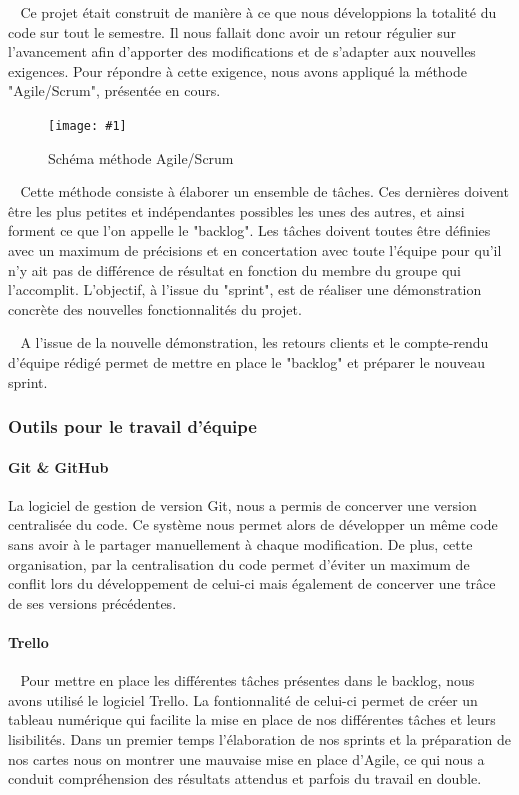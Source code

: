 \documentclass[12pt]{article}
\def\tab{$\>\>\>\>$}
\newcommand\img[2]{
\begin{figure}[!h]
  \centering
    \texttt{[image: \#1]}
  \caption{#2}
  \label{img:#1}
\end{figure}
}
\begin{document}
\tab Ce projet était construit de manière à ce que nous développions la totalité du code sur tout le semestre. Il nous fallait donc avoir un retour régulier sur l'avancement afin d'apporter des modifications et de s'adapter aux nouvelles exigences. Pour répondre à cette exigence, nous avons appliqué la méthode "Agile/Scrum", présentée en cours.

\img{Images/VueGlobaleScrum.png}{Schéma méthode Agile/Scrum}

\tab Cette méthode consiste à élaborer un ensemble de tâches. Ces dernières doivent être les plus petites et indépendantes possibles les unes des autres, et ainsi forment ce que l'on appelle le "backlog". Les tâches doivent toutes être définies avec un maximum de précisions et en concertation avec toute l'équipe pour qu'il n'y ait pas de différence de résultat en fonction du membre du groupe qui l'accomplit. L'objectif, à l'issue du "sprint", est de réaliser une démonstration concrète des nouvelles fonctionnalités du projet.

\tab A l'issue de la nouvelle démonstration, les retours clients et le compte-rendu d'équipe rédigé permet de mettre en place le "backlog" et préparer le nouveau sprint.

\newpage

\subsubsection{Outils pour le travail d'équipe}
\paragraph{Git \& GitHub\\}
La logiciel de gestion de version Git, nous a permis de concerver une version centralisée du code. Ce système nous permet alors de développer un même code sans avoir à le partager manuellement à chaque modification. De plus, cette organisation, par la centralisation du code permet d'éviter un maximum de conflit lors du développement de celui-ci mais également de concerver une trâce de ses versions précédentes.

\paragraph{Trello\\}
\tab Pour mettre en place les différentes tâches présentes dans le backlog, nous avons utilisé le logiciel Trello. La fontionnalité de celui-ci permet de créer un tableau numérique qui facilite la mise en place de nos différentes tâches et leurs lisibilités. Dans un premier temps l'élaboration de nos sprints et la préparation de nos cartes nous on montrer une mauvaise mise en place d'Agile, ce qui nous a conduit compréhension des résultats attendus et parfois du travail en double.
\end{document}
